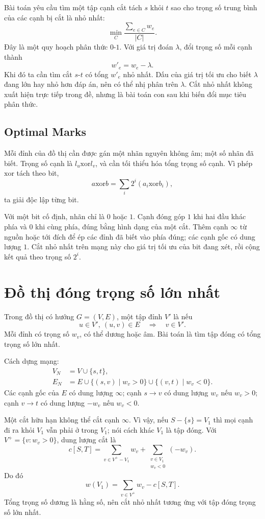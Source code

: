 \documentclass[11pt]{article}
\newcommand{\INF}{\infty}
\newcommand{\xor}{\mathbin{\mathrm{xor}}}
\begin{document}
Bài toán yêu cầu tìm một tập cạnh cắt tách \(s\) khỏi \(t\) sao cho trọng số
trung bình của các cạnh bị cắt là nhỏ nhất:
\[
  \min_C\frac{\sum_{e\in C}w_e}{|C|}.
\]
Đây là một quy hoạch phân thức \(0\)-\(1\). Với giá trị đoán \(\lambda\), đổi
trọng số mỗi cạnh thành
\[
  w'_e=w_e-\lambda.
\]
Khi đó ta cần tìm cắt \(s\)-\(t\) có tổng \(w'_e\) nhỏ nhất. Dấu của giá trị
tối ưu cho biết \(\lambda\) đang lớn hay nhỏ hơn đáp án, nên có thể nhị phân
trên \(\lambda\). Cắt nhỏ nhất không xuất hiện trực tiếp trong đề, nhưng là
bài toán con sau khi biến đổi mục tiêu phân thức.

\subsection{Optimal Marks}

Mỗi đỉnh của đồ thị cần được gán một nhãn nguyên không âm; một số nhãn đã
biết. Trọng số cạnh là \(l_u\xor l_v\), và cần tối thiểu hóa tổng trọng số
cạnh. Vì phép \(\xor\) tách theo bit,
\[
  a\xor b=\sum_i2^i(a_i\xor b_i),
\]
ta giải độc lập từng bit.

Với một bit cố định, nhãn chỉ là \(0\) hoặc \(1\). Cạnh đóng góp \(1\) khi
hai đầu khác phía và \(0\) khi cùng phía, đúng bằng hình dạng của một cắt.
Thêm cạnh \(\INF\) từ nguồn hoặc tới đích để ép các đỉnh đã biết vào phía
đúng; các cạnh gốc có dung lượng \(1\). Cắt nhỏ nhất trên mạng này cho giá
trị tối ưu của bit đang xét, rồi cộng kết quả theo trọng số \(2^i\).

\section{Đồ thị đóng trọng số lớn nhất}

Trong đồ thị có hướng \(G=(V,E)\), một tập đỉnh \(V'\) là  nếu
\[
  u\in V',\ (u,v)\in E \quad\Rightarrow\quad v\in V'.
\]
Mỗi đỉnh có trọng số \(w_v\), có thể dương hoặc âm. Bài toán là tìm tập đóng
có tổng trọng số lớn nhất.

Cách dựng mạng:
\[
\begin{aligned}
V_N &= V\cup\{s,t\},\\
E_N &= E
 \cup\{(s,v)\mid w_v>0\}
 \cup\{(v,t)\mid w_v<0\}.
\end{aligned}
\]
Các cạnh gốc của \(E\) có dung lượng \(\INF\); cạnh \(s\to v\) có dung lượng
\(w_v\) nếu \(w_v>0\); cạnh \(v\to t\) có dung lượng \(-w_v\) nếu \(w_v<0\).

Một cắt hữu hạn không thể cắt cạnh \(\INF\). Vì vậy, nếu \(S-\{s\}=V_1\) thì
mọi cạnh đi ra khỏi \(V_1\) vẫn phải ở trong \(V_1\); nói cách khác \(V_1\)
là tập đóng. Với \(V^+=\{v:w_v>0\}\), dung lượng cắt là
\[
  c[S,T]=\sum_{v\in V^+-V_1}w_v+\sum_{\substack{v\in V_1\\w_v<0}}(-w_v).
\]
Do đó
\[
  w(V_1)=\sum_{v\in V^+}w_v-c[S,T].
\]
Tổng trọng số dương là hằng số, nên cắt nhỏ nhất tương ứng với tập đóng trọng
số lớn nhất.
\end{document}
